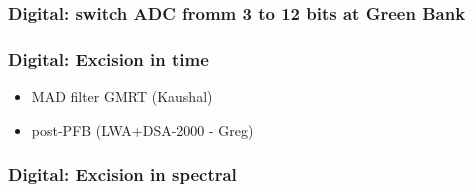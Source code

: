 \subsubsection{Digital: switch ADC fromm 3 to 12 bits at Green Bank}

\subsubsection{Digital: Excision in time}

\begin{itemize}
\item MAD filter GMRT (Kaushal)
\item post-PFB (LWA+DSA-2000 - Greg)
\end{itemize}

\subsubsection{Digital: Excision in spectral}
